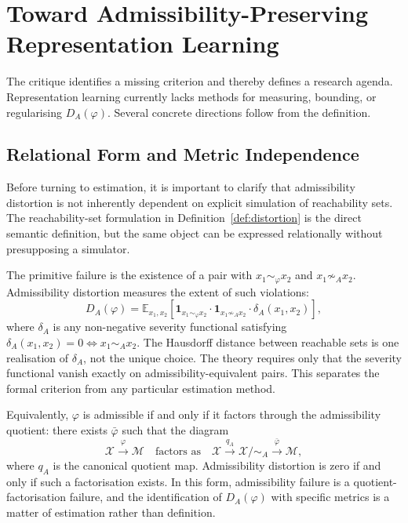 \documentclass[11pt, a4paper]{article}
\theoremstyle{plain}
\theoremstyle{definition}
\theoremstyle{remark}
\newcommand{\simA}{\sim_A}
\newcommand{\DA}{D_A(\varphi)}
\begin{document}
\section{Toward Admissibility-Preserving Representation Learning}

The critique identifies a missing criterion and thereby defines a research
agenda. Representation learning currently lacks methods for measuring, bounding,
or regularising $\DA$. Several concrete directions follow from the definition.

\subsection{Relational Form and Metric Independence}

Before turning to estimation, it is important to clarify that admissibility
distortion is not inherently dependent on explicit simulation of reachability sets.
The reachability-set formulation in Definition~\ref{def:distortion} is the direct
semantic definition, but the same object can be expressed relationally without
presupposing a simulator.

The primitive failure is the existence of a pair with $x_1 \sim_\varphi x_2$ and
$x_1 \not\simA x_2$. Admissibility distortion measures the extent of such
violations:
\begin{equation}
  \DA
  = \mathbb{E}_{x_1,x_2}\!\left[
      \mathbf{1}_{x_1 \sim_\varphi x_2}
      \cdot \mathbf{1}_{x_1 \not\simA x_2}
      \cdot \delta_A(x_1,x_2)
    \right],
\end{equation}
where $\delta_A$ is any non-negative severity functional satisfying
$\delta_A(x_1,x_2) = 0 \iff x_1 \simA x_2$. The Hausdorff distance between
reachable sets is one realisation of $\delta_A$, not the unique choice.
The theory requires only that the severity functional vanish exactly on
admissibility-equivalent pairs. This separates the formal criterion from any
particular estimation method.

Equivalently, $\varphi$ is admissible if and only if it factors through the
admissibility quotient: there exists $\bar{\varphi}$ such that the diagram
\begin{equation}
  \mathcal{X} \xrightarrow{\;\varphi\;} \mathcal{M}
  \quad\text{factors as}\quad
  \mathcal{X} \xrightarrow{q_A} \mathcal{X}/{\simA} \xrightarrow{\;\bar{\varphi}\;} \mathcal{M},
\end{equation}
where $q_A$ is the canonical quotient map. Admissibility distortion is zero if
and only if such a factorisation exists. In this form, admissibility failure is
a quotient-factorisation failure, and the identification of $\DA$ with specific
metrics is a matter of estimation rather than definition.
\end{document}
